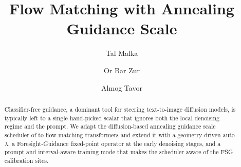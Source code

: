 \documentclass[acmtog]{acmart}
\begin{document}
\title{Flow Matching with Annealing Guidance Scale}

\author{Tal Malka}


\author{Or Bar Zur}

\author{Almog Tavor}


\begin{abstract}
Classifier-free guidance, a dominant tool for steering text-to-image diffusion models, is typically left to a single hand-picked scalar that ignores both the local denoising regime and the prompt. We adapt the diffusion-based annealing guidance scale scheduler of \citet{dahary2025annealing} to flow-matching transformers and extend it with a geometry-driven auto-$\lambda$, a Foresight-Guidance fixed-point operator at the early denoising stages, and a prompt and interval-aware training mode that makes the scheduler aware of the FSG calibration sites.
\end{abstract}
\end{document}
